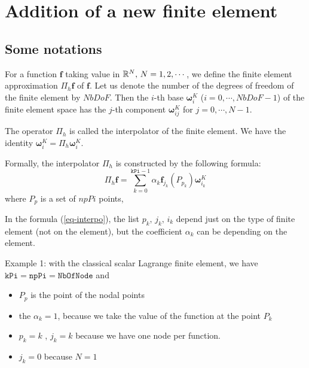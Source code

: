 \section{Addition of a  new finite element}
\label{AddnewFE}
\subsection{Some notations}
\def\Fb#1{\boldsymbol{\omega}^{K}_{#1}}
\def\fbi{\mathbf{\omega}^{K}_{ij}}


For a function $\boldsymbol{f}$ taking value in $\mathbb{R}^{N},\,
N=1,2,\cdots$, we define the finite element approximation $\Pi_h
\boldsymbol{f}$ of $\boldsymbol{f}$. Let us denote the number of the
degrees of freedom of the finite element by $NbDoF$. Then the $i$-th
base  $\boldsymbol{\omega}^{K}_{i}$ ($i=0,\cdots,NbDoF-1$) of the
finite element space has the $j$-th component
$\mathbf{\omega}^{K}_{ij}$ for $j=0,\cdots,N-1$.

The operator  $\Pi_{h}$ is called the interpolator of the finite element.
We have the identity $\boldsymbol{\omega}^{K}_{i} =  \Pi_{h} \boldsymbol{\omega}^{K}_{i} $.

Formally, the interpolator $\Pi_{h}$ is constructed by the following formula:
\begin{equation}
\label{eq-interpo}
\Pi_{h} \boldsymbol{f} = \sum_{k=0}^{\mathtt{kPi}-1} \alpha_k \boldsymbol{f}_{j_{k}}(P_{p_{k}}) \boldsymbol{\omega}^{K}_{i_{k}}
\end{equation}
where $P_{p}$ is a set of $npPi$ points,

In the formula (\ref{eq-interpo}), the list $ p_{k},\, j_{k},\, i_{k}$ depend just on  the type of finite element (not on the element), but the coefficient  $\alpha_{k}$ can be depending on the element.

\medskip
 Example 1: with the classical scalar  Lagrange finite element, we have $\mathtt{kPi}=\mathtt{npPi}=\mathtt{NbOfNode}$ and
\begin{itemize}
\item $P_{p}$ is the point of the nodal points
\item  the $\alpha_k=1$, because we take the value  of the function at the point $P_{k}$
\item $p_{k}=k$ ,  $j_{k}=k$ because we have one node per  function.
\item $j_{k}=0$ because $N=1$
\end{itemize}

